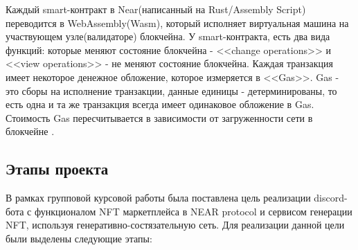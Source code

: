 \begin{remark}
    Каждый smart-контракт в Near(написанный на Rust/Assembly Script) переводится в WebAssembly(Wasm), который исполняет виртуальная машина на участвующем узле(валидаторе) блокчейна. У smart-контракта, есть два вида функций: которые меняют состояние блокчейна - <<change operations>> и <<view operations>> - не меняют состояние блокчейна. Каждая транзакция имеет некоторое денежное обложение, которое измеряется в <<Gas>>. Gas - это сборы на исполнение транзакции, данные единицы - детерминированы, то есть одна и та же транзакция всегда имеет одинаковое обложение в Gas. Стоимость Gas пересчитывается в зависимости от загруженности сети в блокчейне \cite{neargas}.
\end{remark}

\subsection{Этапы проекта}
В рамках групповой курсовой работы была поставлена цель реализации discord-бота с функционалом NFT маркетплейса в NEAR protocol и сервисом генерации NFT, используя генеративно-состязательную сеть. Для реализации данной цели были выделены следующие этапы:
